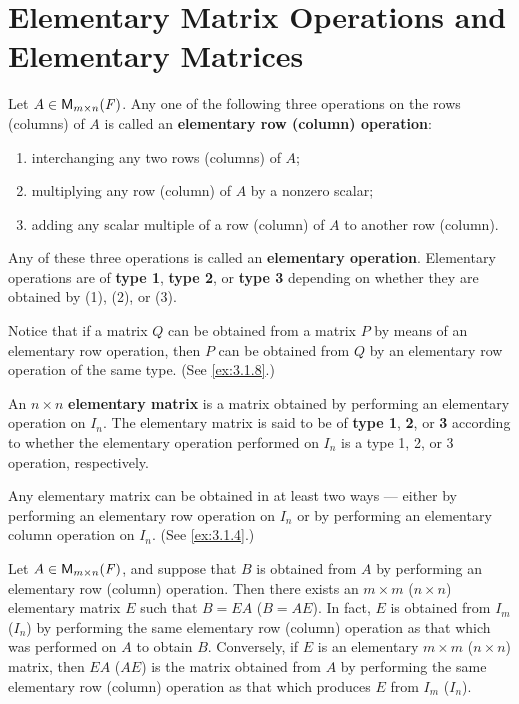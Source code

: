 \section{Elementary Matrix Operations and Elementary Matrices}\label{sec:3.1}

\begin{defn}\label{3.1.1}
  Let \(A \in \ms\).
  Any one of the following three operations on the rows (columns) of \(A\) is called an \textbf{elementary row (column) operation}:
  \begin{enumerate}[label=(\arabic*)]
    \item interchanging any two rows (columns) of \(A\);
    \item multiplying any row (column) of \(A\) by a nonzero scalar;
    \item adding any scalar multiple of a row (column) of \(A\) to another row (column).
  \end{enumerate}
  Any of these three operations is called an \textbf{elementary operation}.
  Elementary operations are of \textbf{type 1}, \textbf{type 2}, or \textbf{type 3} depending on whether they are obtained by (1), (2), or (3).
\end{defn}

\begin{note}
  Notice that if a matrix \(Q\) can be obtained from a matrix \(P\) by means of an elementary row operation, then \(P\) can be obtained from \(Q\) by an elementary row operation of the same type.
  (See \cref{ex:3.1.8}.)
\end{note}

\begin{defn}\label{3.1.2}
  An \(n \times n\) \textbf{elementary matrix} is a matrix obtained by performing an elementary operation on \(I_n\).
  The elementary matrix is said to be of \textbf{type 1}, \textbf{2}, or \textbf{3} according to whether the elementary operation performed on \(I_n\) is a type 1, 2, or 3 operation, respectively.
\end{defn}

\begin{note}
  Any elementary matrix can be obtained in at least two ways ---
  either by performing an elementary row operation on \(I_n\) or by performing an elementary column operation on \(I_n\).
  (See \cref{ex:3.1.4}.)
\end{note}

\begin{thm}\label{3.1}
  Let \(A \in \ms\), and suppose that \(B\) is obtained from \(A\) by performing an elementary row (column) operation.
  Then there exists an \(m \times m\) (\(n \times n\)) elementary matrix \(E\) such that \(B = EA\) (\(B = AE\)).
  In fact, \(E\) is obtained from \(I_m\) (\(I_n\)) by performing the same elementary row (column) operation as that which was performed on \(A\) to obtain \(B\).
  Conversely, if \(E\) is an elementary \(m \times m\) (\(n \times n\)) matrix, then \(EA\) (\(AE\)) is the matrix obtained from \(A\) by performing the same elementary row (column) operation as that which produces \(E\) from \(I_m\) (\(I_n\)).
\end{thm}

